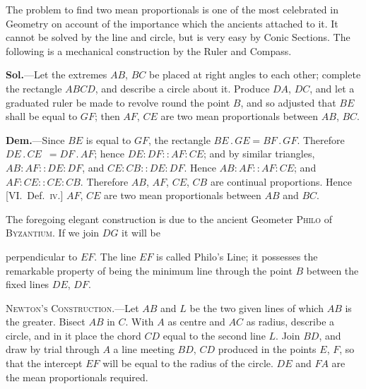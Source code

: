 \documentclass[oneside]{book}
\newcommand{\ibksp}{\hspace{-1.5em}}
\newcommand\imgcent[2]{
\begin{center}

\end{center}
}
\begin{document}
\begin{footnotesize}
The problem to find two mean proportionals is one of the most
celebrated in Geometry on account of the importance which the
ancients attached to it. It cannot be solved by the line and
circle, but is very easy by Conic Sections. The following is a
mechanical construction by the Ruler and Compass.

\textbf{Sol.}---Let the extremes $AB$, $BC$ be placed at right angles to
each other; complete the rectangle $ABCD$, and describe a circle
about it. Produce $DA$, $DC$, and let a graduated ruler be made
to revolve round the point $B$, and so adjusted that $BE$ shall be
equal to $GF$; then $AF$, $CE$ are two mean proportionals between
$AB$, $BC$.


\imgcent{178}{f251}

\textbf{Dem.}---Since $BE$ is equal to $GF$, the rectangle $BE\,.\,GE
= BF\,.\,GF$. Therefore $DE\,.\,CE$\ $= DF\,.\,AF$; hence $DE : DF
:: AF : CE$; and by similar triangles, $AB : AF :: DE : DF$, and
$CE : CB :: DE : DF$. Hence $AB : AF :: AF : CE$; and $AF : CE
:: CE : CB$. Therefore $AB$, $AF$, $CE$, $CB$ are continual proportions.
Hence [VI\@.\ Def.~\textsc{iv.}] $AF$, $CE$ are two mean proportionals
between $AB$ and $BC$.

The foregoing elegant construction is due to the ancient
Geometer \textsc{Philo} of \textsc{Byzantium}. If we join $DG$ it will be

perpendicular to $EF$. The line $EF$ is called Philo's Line; it
possesses the remarkable property of being the minimum line
through the point $B$ between the fixed lines $DE$, $DF$.

\addcontentsline{toc}{section}{\ibksp\;,,\protect\phantom{.---}Newton's solution,}
\textsc{Newton's Construction.}---Let $AB$ and $L$ be the two given
lines of which $AB$ is the greater. Bisect $AB$ in $C$. With $A$ as
centre and $AC$ as radius, describe a circle, and in it place the
chord $CD$ equal to the second line $L$. Join $BD$, and draw by
trial through $A$ a line meeting $BD$, $CD$ produced in the points
$E$, $F$, so that the intercept $EF$ will be equal to the radius of the
circle. $DE$ and $FA$ are the mean proportionals required.


\imgcent{190}{f252}


\end{footnotesize}
\end{document}
